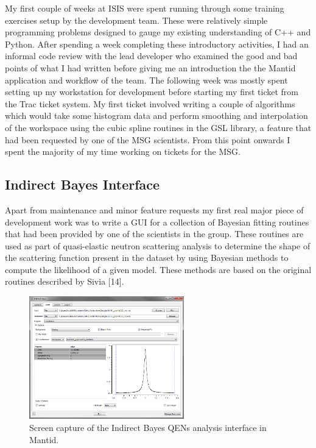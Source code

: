 \documentclass[paper=a4, fontsize=11pt]{scrartcl}	%
\numberwithin{equation}{section}															%
\numberwithin{figure}{section}																%
\numberwithin{table}{section}
\begin{document}
My first couple of weeks at ISIS were spent running through some
training exercises setup by the development team. These were relatively
simple programming problems designed to gauge my existing understanding
of C++ and Python. After spending a week completing these introductory
activities, I had an informal code review with the lead developer who
examined the good and bad points of what I had written before giving me
an introduction the the Mantid application and workflow of the team. The
following week was mostly spent setting up my workstation for
development before starting my first ticket from the Trac ticket system.
My first ticket involved writing a couple of algorithms which would take
some histogram data and perform smoothing and interpolation of the
workspace using the cubic spline routines in the GSL library, a feature
that had been requested by one of the MSG scientists. From this point
onwards I spent the majority of my time working on tickets for the MSG.

\subsection{Indirect Bayes Interface}\label{indirect-bayes-interface}

Apart from maintenance and minor feature requests my first real major
piece of development work was to write a GUI for a collection of
Bayesian fitting routines that had been provided by one of the
scientists in the group. These routines are used as part of
quasi-elastic neutron scattering analysis to determine the shape of the
scattering function present in the dataset by using Bayesian methods to
compute the likelihood of a given model. These methods are based on the
original routines described by Sivia {[}14{]}.

\begin{figure}[H]
\centering
\includegraphics[width=0.6\textwidth]{img/iris-bayes-quasi.png}
\caption{Screen capture of the Indirect Bayes QENs analysis interface in Mantid.}
\label{fig:bayes-gui}
\end{figure}
\end{document}

